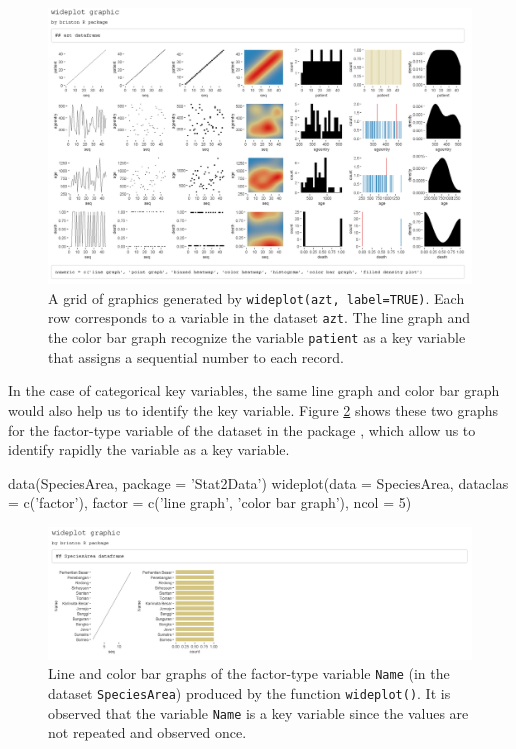 \begin{Schunk}
	\begin{figure}[H]
\includegraphics[width=0.9\linewidth]{figures/wideplot_azt} \caption[Output of 'wideplot(azt, label=TRUE)']{A grid of graphics generated by \texttt{wideplot(azt, label=TRUE)}. Each row corresponds to a variable in the dataset \texttt{azt}. The line graph and the color bar graph recognize the variable \texttt{patient} as a key variable that assigns a sequential number to each record.}\label{fig:wideplotazt}
	\end{figure}
\end{Schunk}

In the case of categorical key variables, the same line graph and color
bar graph would also help us to identify the key variable. Figure
\ref{fig:SpeciesArea} shows these two graphs for the factor-type
variable of the dataset  in the package
, which allow us to identify rapidly the variable
 as a key variable.

\begin{example}
  data(SpeciesArea, package = 'Stat2Data')
  wideplot(data = SpeciesArea, dataclas = c('factor'), 
           factor = c('line graph', 'color bar graph'), ncol = 5)
\end{example}


\begin{Schunk}
	\begin{figure}[H]
\includegraphics[width=0.8\linewidth]{figures/wideplot_SpeciesArea} \caption[Identification of key variables]{Line and color bar graphs of the factor-type variable \texttt{Name} (in the dataset \texttt{SpeciesArea}) produced by the function \texttt{wideplot()}. It is observed that the variable \texttt{Name} is a key variable since the values are not repeated and observed once.}\label{fig:SpeciesArea}
	\end{figure}
\end{Schunk}

